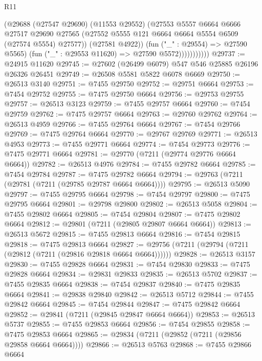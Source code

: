 \begin{lexlean}{R11}
\begin{coremodule}
                        (@29688
                          (@27547 @29690)
                          (@11553 @29552)
                          (@27553
                            @5557
                            @6664
                            @6666
                            @27517
                            @29690
                            @27565
                            (@27552 @5555 @121 @6664 @6664 @5554 @6509 (@27574 @5554) @27577))
                          (@27581 @4922))
                        (fun ("_" : @29554) => @27590 @5565)
                        (fun ("_" : @29553 @11620) => @27590 @5572)))))))))))
@29737 := @24915 @11620
@29745 := @27602 (@26499 @6079) @547 @546 @25885 @26196 @26326 @26451
@29749 := @26508 @5581 @5822 @6078 @6669
@29750 := @26513 @3140
@29751 := @7455 @29750
@29752 := @29751 @6664
@29753 := @7454 @29752
@29755 := @7475 @29750 @6664
@29756 := @29753 @29755
@29757 := @26513 @3123
@29759 := @7455 @29757 @6664
@29760 := @7454 @29759
@29762 := @7475 @29757 @6664
@29763 := @29760 @29762
@29764 := @26513 @4959
@29766 := @7455 @29764 @6664
@29767 := @7454 @29766
@29769 := @7475 @29764 @6664
@29770 := @29767 @29769
@29771 := @26513 @4953
@29773 := @7455 @29771 @6664
@29774 := @7454 @29773
@29776 := @7475 @29771 @6664
@29781 := @29770 (@7211 (@29774 @29776 @6664 @6664))
@29782 := @26513 @4976
@29784 := @7455 @29782 @6664
@29785 := @7454 @29784
@29787 := @7475 @29782 @6664
@29794 := @29763 (@7211 (@29781 (@7211 (@29785 @29787 @6664 @6664))))
@29795 := @26513 @5090
@29797 := @7455 @29795 @6664
@29798 := @7454 @29797
@29800 := @7475 @29795 @6664
@29801 := @29798 @29800
@29802 := @26513 @5058
@29804 := @7455 @29802 @6664
@29805 := @7454 @29804
@29807 := @7475 @29802 @6664
@29812 := @29801 (@7211 (@29805 @29807 @6664 @6664))
@29813 := @26513 @5672
@29815 := @7455 @29813 @6664
@29816 := @7454 @29815
@29818 := @7475 @29813 @6664
@29827 := @29756 (@7211 (@29794 (@7211 (@29812 (@7211 (@29816 @29818 @6664 @6664))))))
@29828 := @26513 @3157
@29830 := @7455 @29828 @6664
@29831 := @7454 @29830
@29833 := @7475 @29828 @6664
@29834 := @29831 @29833
@29835 := @26513 @5702
@29837 := @7455 @29835 @6664
@29838 := @7454 @29837
@29840 := @7475 @29835 @6664
@29841 := @29838 @29840
@29842 := @26513 @5712
@29844 := @7455 @29842 @6664
@29845 := @7454 @29844
@29847 := @7475 @29842 @6664
@29852 := @29841 (@7211 (@29845 @29847 @6664 @6664))
@29853 := @26513 @5737
@29855 := @7455 @29853 @6664
@29856 := @7454 @29855
@29858 := @7475 @29853 @6664
@29865 := @29834 (@7211 (@29852 (@7211 (@29856 @29858 @6664 @6664))))
@29866 := @26513 @5763
@29868 := @7455 @29866 @6664

\end{coremodule}
\end{lexlean}
